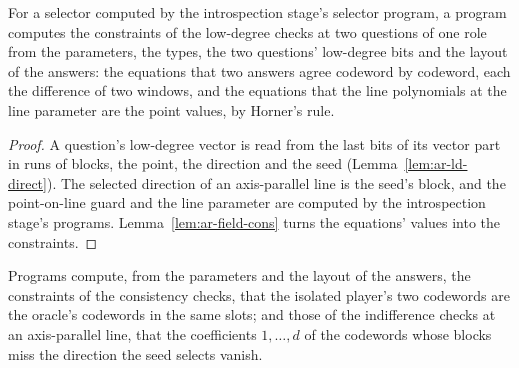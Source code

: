 \begin{lemma}
\label{lem:ar-ld-cons}
\leanok
For a selector computed by the introspection stage's selector program, a program computes the
constraints of the low-degree checks at two questions of one role from the parameters, the
types, the two questions' low-degree bits and the layout of the answers: the equations that two
answers agree codeword by codeword, each the difference of two windows, and the equations that
the line polynomials at the line parameter are the point values, by Horner's rule.
\end{lemma}

\begin{proof}
\leanok
A question's low-degree vector is read from the last bits of its vector part in runs of blocks,
the point, the direction and the seed (Lemma~\ref{lem:ar-ld-direct}). The selected direction of
an axis-parallel line is the seed's block, and the point-on-line guard and the line parameter are
computed by the introspection stage's programs. Lemma~\ref{lem:ar-field-cons} turns the
equations' values into the constraints.
\end{proof}

\begin{lemma}
\label{lem:ar-slot-cons}
\leanok
Programs compute, from the parameters and the layout of the answers, the constraints of the
consistency checks, that the isolated player's two codewords are the oracle's codewords in the
same slots; and those of the indifference checks at an axis-parallel line, that the coefficients
$1, \ldots, d$ of the codewords whose blocks miss the direction the seed selects vanish.
\end{lemma}

